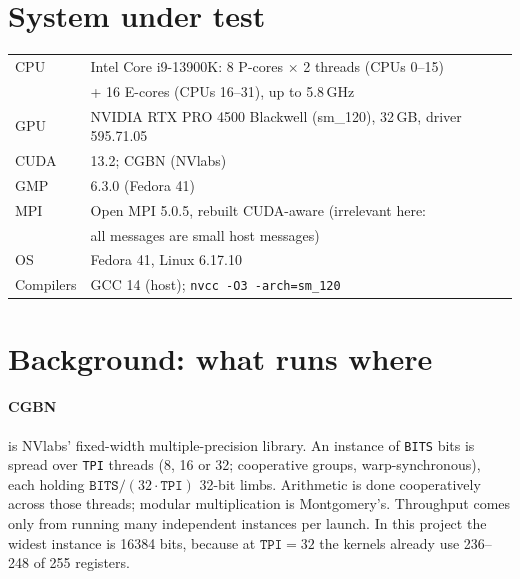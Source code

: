 \documentclass[11pt,a4paper]{article}
\newcommand{\code}[1]{\texttt{#1}}
\begin{document}
\section{System under test}

\begin{center}
\begin{tabular}{ll}
\toprule
CPU & Intel Core i9-13900K: 8 P-cores $\times$ 2 threads (CPUs 0--15) \\
    & + 16 E-cores (CPUs 16--31), up to 5.8\,GHz \\
GPU & NVIDIA RTX PRO 4500 Blackwell (sm\_120), 32\,GB, driver 595.71.05 \\
CUDA & 13.2; CGBN (NVlabs) \\
GMP & 6.3.0 (Fedora 41) \\
MPI & Open MPI 5.0.5, rebuilt CUDA-aware (irrelevant here: \\
    & all messages are small host messages) \\
OS & Fedora 41, Linux 6.17.10 \\
Compilers & GCC 14 (host); \code{nvcc -O3 -arch=sm\_120} \\
\bottomrule
\end{tabular}
\end{center}

\section{Background: what runs where}

\paragraph{CGBN} is NVlabs' fixed-width multiple-precision library. An
instance of \code{BITS} bits is spread over \code{TPI} threads (8, 16 or
32; cooperative groups, warp-synchronous), each holding $\code{BITS}/(32
\cdot \code{TPI})$ 32-bit limbs. Arithmetic is done cooperatively across
those threads; modular multiplication is Montgomery's. Throughput comes
only from running many independent instances per launch. In this project
the widest instance is 16384 bits, because at $\code{TPI} = 32$ the
kernels already use 236--248 of 255 registers.
\end{document}

